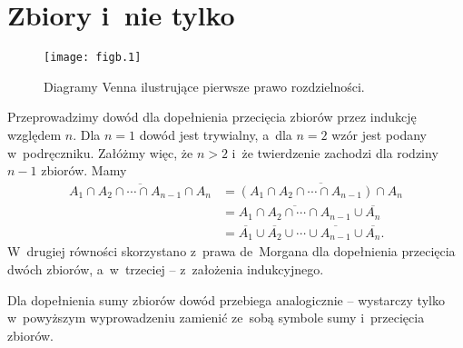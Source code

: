 \chapter{Zbiory i~nie tylko}


\exercise %
\begin{figure}[ht]
	\begin{center}
		\texttt{[image: figb.1]}
	\end{center}
	\caption{Diagramy Venna ilustrujące pierwsze prawo rozdzielności.}
\end{figure}

\exercise %
Przeprowadzimy dowód dla dopełnienia przecięcia zbiorów przez indukcję względem $n$. Dla $n=1$ dowód jest trywialny, a~dla $n=2$ wzór jest podany w~podręczniku. Załóżmy więc, że $n>2$ i~że twierdzenie zachodzi dla rodziny $n-1$ zbiorów. Mamy
\begin{align*}
	\overline{A_1\cap A_2\cap\cdots\cap A_{n-1}\cap A_n} &= \overline{(A_1\cap A_2\cap\cdots\cap A_{n-1})\cap A_n} \\
	&= \overline{A_1\cap A_2\cap\cdots\cap A_{n-1}}\cup\overline{A_n} \\
	&= \overline{A_1}\cup\overline{A_2}\cup\cdots\cup\overline{A_{n-1}}\cup\overline{A_n}.
\end{align*}
W~drugiej równości skorzystano z~prawa de~Morgana dla dopełnienia przecięcia dwóch zbiorów, a~w~trzeciej -- z~założenia indukcyjnego.

Dla dopełnienia sumy zbiorów dowód przebiega analogicznie -- wystarczy tylko w~powyższym wyprowadzeniu zamienić ze~sobą symbole sumy i~przecięcia zbiorów.

